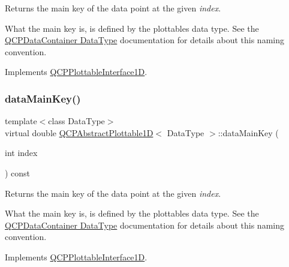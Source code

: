 Returns the main key of the data point at the given {\itshape index}.

What the main key is, is defined by the plottable\textquotesingle{}s data type. See the \hyperlink{class_q_c_p_data_container_qcpdatacontainer-datatype}{Q\+C\+P\+Data\+Container Data\+Type} documentation for details about this naming convention. 

Implements \hyperlink{class_q_c_p_plottable_interface1_d_a2bd60daaac046945fead558cbd83cf73}{Q\+C\+P\+Plottable\+Interface1D}.

\mbox{\label{class_q_c_p_abstract_plottable1_d_aa996a79be21741bdea8284f0bb776ed1}} 
\subsubsection{\texorpdfstring{data\+Main\+Key()}{dataMainKey()}\hspace{0.1cm}{\footnotesize\ttfamily [2/2]}}
{\footnotesize\ttfamily template$<$class Data\+Type$>$ \\
virtual double \hyperlink{class_q_c_p_abstract_plottable1_d}{Q\+C\+P\+Abstract\+Plottable1D}$<$ Data\+Type $>$\+::data\+Main\+Key (\begin{DoxyParamCaption}\item[{int}]{index }\end{DoxyParamCaption}) const\hspace{0.3cm}{\ttfamily [virtual]}}

Returns the main key of the data point at the given {\itshape index}.

What the main key is, is defined by the plottable\textquotesingle{}s data type. See the \hyperlink{class_q_c_p_data_container_qcpdatacontainer-datatype}{Q\+C\+P\+Data\+Container Data\+Type} documentation for details about this naming convention. 

Implements \hyperlink{class_q_c_p_plottable_interface1_d_a2bd60daaac046945fead558cbd83cf73}{Q\+C\+P\+Plottable\+Interface1D}.

\mbox{\label{class_q_c_p_abstract_plottable1_d_a0f913bb0889ca7cb574657a078fc8cff}} 
